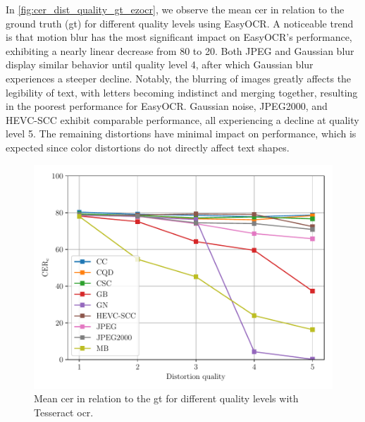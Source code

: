 In \autoref{fig:cer_dist_quality_gt_ezocr}, we observe the mean \gls{cer} in relation to the ground truth (\gls{gt}) for different quality levels using EasyOCR.
A noticeable trend is that motion blur has the most significant impact on EasyOCR's performance, exhibiting a nearly linear decrease from 80 to 20.
Both JPEG and Gaussian blur display similar behavior until quality level 4, after which Gaussian blur experiences a steeper decline.
Notably, the blurring of images greatly affects the legibility of text, with letters becoming indistinct and merging together, resulting in the poorest performance for EasyOCR.
Gaussian noise, JPEG2000, and HEVC-SCC exhibit comparable performance, all experiencing a decline at quality level 5.
The remaining distortions have minimal impact on performance, which is expected since color distortions do not directly affect text shapes.

\begin{figure}[h]
\centering
    \includegraphics[width=\textwidth]{../../images/analyze/cer_dist_quality_gt_tess.pdf}
    \caption{Mean \gls{cer} in relation to the \gls{gt} for different quality levels with Tesseract \gls{ocr}.}
\label{fig:cer_dist_quality_gt_tesseract}
\end{figure}

